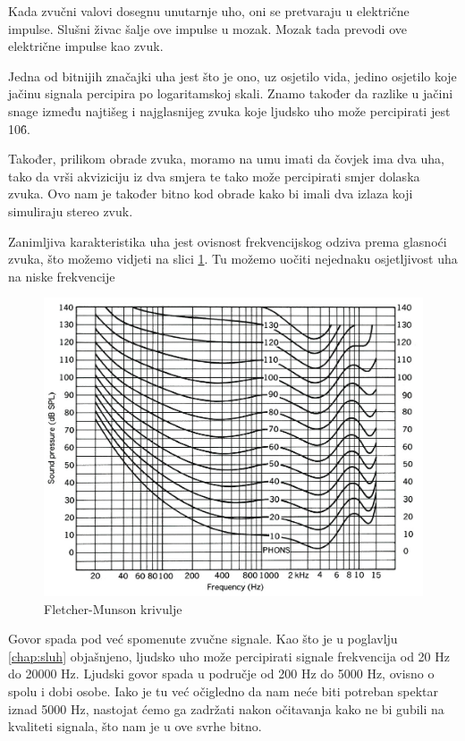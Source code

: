 \documentclass[times, utf8, diplomski]{fer}
\begin{document}
Kada zvučni valovi dosegnu unutarnje uho, oni se pretvaraju u električne impulse. Slušni živac šalje ove impulse u mozak. Mozak tada prevodi ove električne impulse kao zvuk.\citep{uho}

Jedna od bitnijih značajki uha jest što je ono, uz osjetilo vida, jedino osjetilo koje jačinu signala percipira po logaritamskoj skali. Znamo također da razlike u jačini snage između najtišeg i najglasnijeg zvuka koje ljudsko uho može percipirati jest 10\^6.

Također, prilikom obrade zvuka, moramo na umu imati da čovjek ima dva uha, tako da vrši akviziciju iz dva smjera te tako može percipirati smjer dolaska zvuka. Ovo nam je također bitno kod obrade kako bi imali dva izlaza koji simuliraju stereo zvuk.

Zanimljiva karakteristika uha jest ovisnost frekvencijskog odziva prema glasnoći zvuka, što možemo vidjeti na slici \ref{flemu}. Tu možemo uočiti nejednaku osjetljivost uha na niske frekvencije

\begin{figure}[hbt!]
 \centering
 \includegraphics[scale=0.4]{photos/flemu.jpg}
 \caption{Fletcher-Munson krivulje}
 \label{flemu}
\end{figure}
Govor spada pod već spomenute zvučne signale. Kao što je u poglavlju \ref{chap:sluh} objašnjeno, ljudsko uho može percipirati signale frekvencija od 20 Hz do 20000 Hz. Ljudski govor spada u područje od 200 Hz do 5000 Hz, ovisno o spolu i dobi osobe. Iako je tu već očigledno da nam neće biti potreban spektar iznad 5000 Hz, nastojat ćemo ga zadržati nakon očitavanja kako ne bi gubili na kvaliteti signala, što nam je u ove svrhe bitno.
\end{document}
